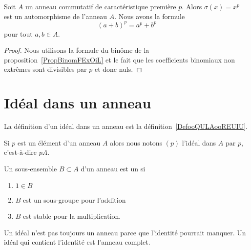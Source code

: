 \begin{proposition}     \label{Propqrrdem}
	Soit \( A\) un anneau commutatif de caractéristique première \( p\). Alors \( \sigma(x)=x^p\) est un automorphisme de l'anneau \( A\). Nous avons la formule
	\begin{equation}
		(a+b)^p=a^p+b^p
	\end{equation}
	pour tout \( a,b\in A\).
\end{proposition}

\begin{proof}
	Nous utilisons la formule du binôme de la proposition~\ref{PropBinomFExOiL} et le fait que les coefficients binomiaux non extrêmes sont divisibles par \( p\) et donc nuls.
\end{proof}

\section{Idéal dans un anneau}

La définition d'un idéal dans un anneau est la définition~\ref{DefooQULAooREUIU}.

\begin{definition}  \label{DefSKTooOTauAR}
	Si \( p\) est un élément d'un anneau \( A\) alors nous notons \( (p)\) l'idéal dans \( A\)  par \( p\), c'est-à-dire \( pA\).
\end{definition}

\begin{definition}  \label{DefAJVTPxb}
	Un sous-ensemble \( B\subset A\) d'un anneau est un  si
	\begin{enumerate}
		\item
		      \( 1\in B\)
		\item
		      \( B\) est un sous-groupe pour l'addition
		\item
		      \( B\) est stable pour la multiplication.
	\end{enumerate}
\end{definition}

\begin{remark}
	Un idéal n'est pas toujours un anneau parce que l'identité pourrait manquer. Un idéal qui contient l'identité est l'anneau complet.
\end{remark}

